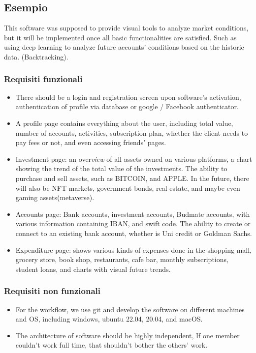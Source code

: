 \documentclass[a4paper,12pt]{report}
\begin{document}
\subsection*{Esempio}
This software was supposed to provide visual tools to analyze market conditions, but it will be implemented once all basic functionalities are satisfied.
%
Such as using deep learning to analyze future accounts' conditions based on the historic data. (Backtracking).

\subsubsection{Requisiti funzionali}
\begin{itemize}
    \item There should be a login and registration screen upon software's activation, authentication of profile via database or google / Facebook authenticator.
    \item A profile page contains everything about the user, including total value, number of accounts, activities, subscription plan, whether the client needs to pay fees or not, and even accessing friends' pages.
    \item Investment page: an over\textit{view} of all assets owned on various platforms, a chart showing the trend of the total value of the investments. The ability to purchase and sell assets, such as BITCOIN, and APPLE. In the future, there will also be NFT markets, government bonds, real estate, and maybe even gaming assets(metaverse).
    \item Accounts page: Bank accounts, investment accounts, Budmate accounts, with various information containing IBAN, and swift code. 
    The ability to create or connect to an existing bank account, whether is Uni credit or Goldman Sachs.
    \item Expenditure page:  shows various kinds of expenses done in the shopping mall, grocery store, book shop, restaurants, cafe bar, monthly subscriptions, student loans, and charts with visual future trends.
\end{itemize}

\subsubsection{Requisiti non funzionali}
\begin{itemize}
    \item For the workflow, we use git and develop the software on different machines and OS, including windows, ubuntu 22.04, 20.04, and macOS. 
    \item The architecture of software should be highly independent, If one member couldn't work full time, that shouldn't bother the others' work.
\end{itemize}
\end{document}

